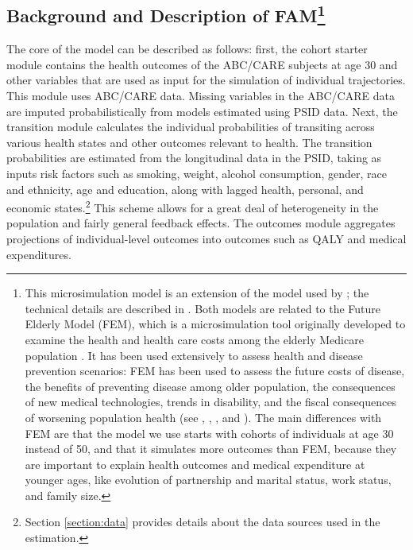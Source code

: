 \subsection{Background and Description of FAM\footnote{This microsimulation model is an extension of the model used by \citet{Prados_etal_2015_How-Much-Can-Education}; the technical details are described in \citet{Goldman_etal_2015_Future-Adult-Model}. Both models are related to the Future Elderly Model (FEM), which is a microsimulation tool originally developed to examine the health and health care costs among the elderly Medicare population \citep{Goldman_etal_2004_RAND-Report_Health-Status-Elderly}. It has been used extensively to assess health and disease prevention scenarios: FEM has been used to assess the future costs of disease, the benefits of preventing disease among older population, the consequences of new medical technologies, trends in disability, and the fiscal consequences of worsening population health (see \citet{Goldman_etal_2004_RAND-Report_Health-Status-Elderly}, \citet{Lakdawalla_etal_2004_Health-and-Cost}, \citet{Goldman_etal_2005_HA}, and \citet{Zissimopoulos_etal_2014_Delaying-Alzheimers}). The main differences with FEM are that the model we use starts with cohorts of individuals at age 30 instead of 50, and that it simulates more outcomes than FEM, because they are important to explain health outcomes and medical expenditure at younger ages, like evolution of partnership and marital status, work status, and family size.}}

\noindent The core of the model can be described as follows: first, the cohort starter module contains the health outcomes of the ABC/CARE subjects at age 30 and other variables that are used as input for the simulation of individual trajectories. This module uses ABC/CARE data. Missing variables in the ABC/CARE data are imputed probabilistically from models estimated using PSID data. Next, the transition module calculates the individual probabilities of transiting across various health states and other outcomes relevant to health. The transition probabilities are estimated from the longitudinal data in the PSID, taking as inputs risk factors such as smoking, weight, alcohol consumption, gender, race and ethnicity, age and education, along with lagged health, personal, and economic states.\footnote{Section \ref{section:data} provides details about the data sources used in the estimation.} This scheme allows for a great deal of heterogeneity in the population and fairly general feedback effects. The outcomes module aggregates projections of individual-level outcomes into outcomes such as
QALY and medical expenditures.


